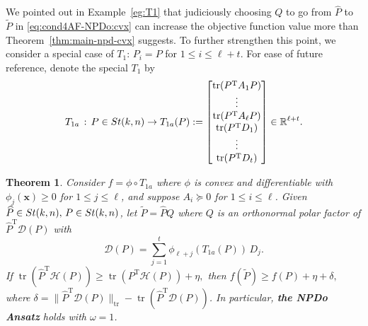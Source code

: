 \documentclass[11pt]{article}
\def\bx{\pmb{x}}
\def\bbP{\mathbb{P}}
\def\bbR{\mathbb{R}}
\def\scrD{\mathscr{D}}
\def\scrH{\mathscr{H}}
\def\wtd{\widetilde}
\def\what{\widehat}
\newcommand\STM[2]{{\rm St}(#1,#2)}
\DeclareMathOperator{\tr}{tr}
\DeclareMathOperator{\T}{T}
\newtheorem{theorem}{Theorem}[section]
\theoremstyle{definition}
\numberwithin{equation}{section}
\begin{document}
We pointed out in Example~\ref{eg:T1} that judiciously choosing $Q$ to go from $\what P$ to $\wtd P$ in
\eqref{eq:cond4AF-NPDo:cvx} can increase the objective function value more than Theorem~\ref{thm:main-npd-cvx} suggests.
To further strengthen this point,
%
we consider a special case of $T_1$:
$P_i=P$ for $1\le i\le \ell+t$. For ease of future reference,  denote the special $T_1$ by
\begin{equation}\label{eq:T-tr-a}
T_{1a}\,:\, P\in\STM{k}{n} \to T_{1a}(P):=\begin{bmatrix}
                                        \tr(P^{\T}A_1P) \\
                                        \vdots \\
                                        \tr(P^{\T}A_{\ell}P) \\
                                        \tr(P^{\T}D_1) \\
                                        \vdots \\
                                        \tr(P^{\T}D_t) \\
                                      \end{bmatrix} \in\bbR^{\ell+t}.
\end{equation}


\begin{theorem}\label{thm:main-npd-cvx:T1a}
Consider $f=\phi\circ T_{1a}$ where $\phi$ is convex and differentiable with
$\phi_j(\bx)\ge 0$ for $1\le j\le\ell$,  and suppose $A_i\succeq 0$ for $1\le i\le\ell$.
Given $\what P\in\STM{k}{n},\,P\in\STM{k}{n}$, let $\wtd P=\what PQ$ where
$Q$ is an orthonormal polar factor of $\what P^{\T}\scrD(P)$ with
\begin{equation}\label{eq:scrD}
\scrD(P)=\sum_{j=1}^{t}\phi_{\ell+j}(T_{1a}(P))\, D_j.
\end{equation}
If
$
\tr(\what P^{\T}\scrH(P))\ge\tr(P^{\T}\scrH(P))+\eta,
$
then
$
f(\wtd P)\ge f(P)+\eta+\delta,
$
where $\delta=\|\what P^{\T}\scrD(P)\|_{\tr}-\tr(\what P^{\T}\scrD(P))$.
In particular, {\bf the NPDo Ansatz} holds  with $\omega=1$.
\end{theorem}
\end{document}
